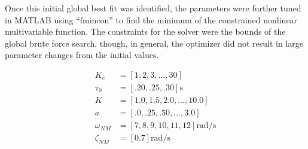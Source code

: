Once this initial global best fit was identified, the parameters were further tuned in MATLAB using ``fmincon'' to find the minimum of the constrained nonlinear multivariable function.
The constraints for the solver were the bounds of the global brute force search, though, in general, the optimizer did not result in large parameter changes from the initial values.

\begin{align}
\nonumber    K_e         & = [1, 2, 3, \ldots, 30]         \\
\nonumber    \tau_0      & = [.20, .25, .30] \mbox{s}             \\
\nonumber    K           & = [1.0, 1.5, 2.0, \ldots, 10.0] \\
\nonumber    a           & = [.0, .25, .50, \ldots, 3.0]   \\
\nonumber    \omega_{NM} & = [7, 8, 9, 10, 11, 12] \mbox{rad/s}   \\
\nonumber    \zeta_{NM}  & = [0.7] \mbox{rad/s}
\end{align}







